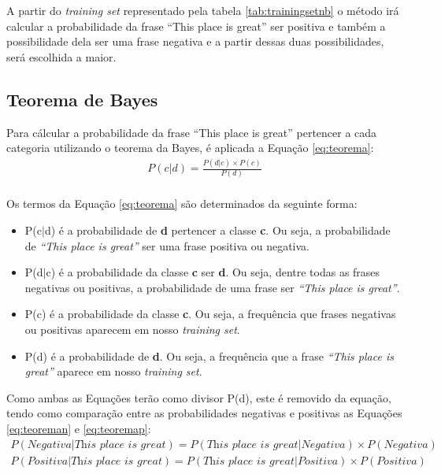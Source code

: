 A partir do \textit{training set} representado pela tabela
\ref{tab:trainingsetnb} o método irá calcular a probabilidade da frase ``This
place is great'' ser positiva e também a possibilidade dela ser uma frase
negativa e a partir dessas duas possibilidades, será escolhida a maior.


\subsection{Teorema de Bayes}

Para cálcular a probabilidade da frase ``This place is great'' pertencer a cada categoria
utilizando o teorema da Bayes, é aplicada a Equação \ref{eq:teorema}:
\begin{equation}
\begin{gathered}
P(c|d) = \frac{P(d|c) \times P(c)}{P(d)} \\
\label{eq:teorema}
\end{gathered}
\end{equation}

Os termos da Equação \ref{eq:teorema} são determinados da seguinte forma:
\begin{itemize}
  \item P(c$\vert$d) é a probabilidade de \textbf{d} pertencer a classe
  \textbf{c}. Ou seja, a probabilidade de \textit{``This place is great''} ser
  uma frase positiva ou negativa.
  \item P(d$\vert$c) é a probabilidade da classe \textbf{c} ser \textbf{d}. Ou
  seja, dentre todas as frases negativas ou positivas, a probabilidade de
  uma frase ser \textit{``This place is great''}.
  \item P(c) é a probabilidade da classe \textbf{c}. Ou seja, a frequência que
  frases negativas ou positivas aparecem em nosso \textit{training
  set}.
  \item P(d) é a probabilidade de \textbf{d}. Ou seja, a frequência que
  a frase \textit{``This place is great''} aparece em nosso \textit{training
  set}.
\end{itemize}

Como ambas as Equações terão como divisor P(d), este é removido da equação, tendo como
comparação entre as probabilidades negativas e positivas as Equações
\ref{eq:teoreman} e \ref{eq:teoremap}:
\begin{equation}
\begin{gathered}
P(Negativa|\textit{This place is great})
=
P(\textit{This place is great}|Negativa) \times
P(Negativa)
\label{eq:teoreman}
\end{gathered}
\end{equation}
\begin{equation}
\begin{gathered}
P(Positiva|\textit{This place is great})
=
P(\textit{This place is great}|Positiva) \times
P(Positiva)
\label{eq:teoremap}
\end{gathered}
\end{equation}

